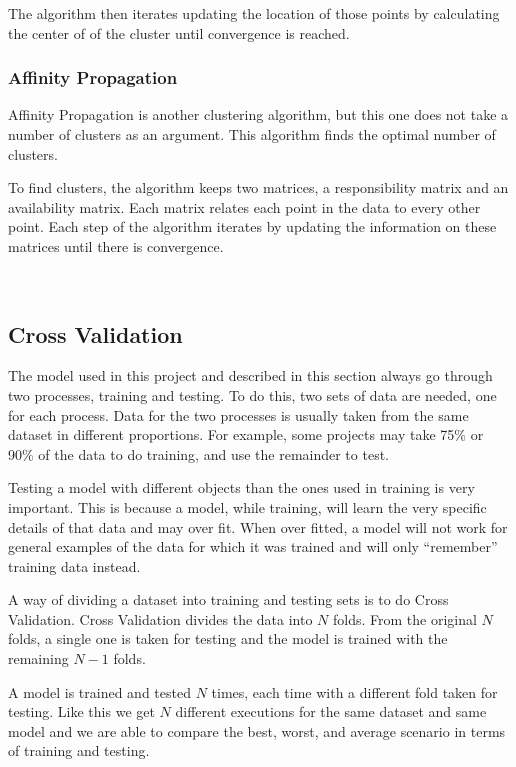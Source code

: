 The algorithm then iterates updating the location of those points by
calculating the center of of the cluster until convergence is
reached.~\cite{book_ml,book_dm_practical}

\subsubsection{Affinity Propagation}

Affinity Propagation is another clustering algorithm, but this one does not
take a number of clusters as an argument. This algorithm finds the optimal
number of clusters.

To find clusters, the algorithm keeps two matrices, a responsibility matrix and
an availability matrix. Each matrix relates each point in the data to every
other point. Each step of the algorithm iterates by updating the information on
these matrices until there is convergence.

~\cite{book_ml,book_dm_practical}

\subsection{Cross Validation}
\label{sec:cross_val}

The model used in this project and described in this section always go through
two processes, training and testing. To do this, two sets of data are needed,
one for each process. Data for the two processes is usually taken from the same
dataset in different proportions. For example, some projects may take 75\% or
90\% of the data to do training, and use the remainder to test.

Testing a model with different objects than the ones used in training is very
important. This is because a model, while training, will learn the very
specific details of that data and may over fit. When over fitted, a model will
not work for general examples of the data for which it was trained and will
only ``remember'' training data instead.

A way of dividing a dataset into training and testing sets is to do Cross
Validation. Cross Validation divides the data into $ N $ folds. From the
original $ N $ folds, a single one is taken for testing and the model is
trained with the remaining $ N - 1 $ folds.

A model is trained and tested $ N $ times, each time with a different fold
taken for testing. Like this we get $ N $ different executions for the same
dataset and same model and we are able to compare the best, worst, and average
scenario in terms of training and testing.~\cite{book_dm_practical}

